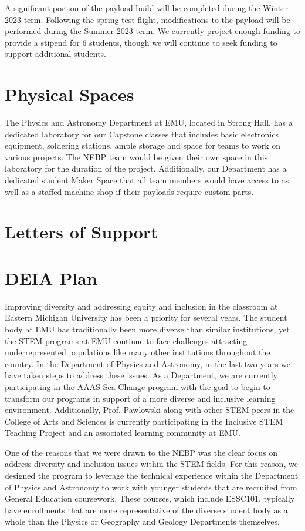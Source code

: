 \documentclass[12pt]{article}
\begin{document}
A significant portion of the payload build will be completed during the Winter 2023
term. Following the spring test flight, modifications to the payload will be 
performed during the Summer 2023 term. We currently project enough funding to 
provide a stipend for 6 students, though we will continue to seek funding to support 
additional students.




\section{Physical Spaces}
The Physics and Astronomy Department at EMU, located in Strong Hall, has a dedicated 
laboratory for our Capstone classes that includes basic electronics equipment, 
soldering stations, ample storage and space for teams to work on various projects.
 The NEBP team would be given their own space in this laboratory for the duration of 
 the project. Additionally, our Department has a dedicated student Maker Space that all
  team members would have access to as well as a staffed machine shop if their payloads 
  require custom parts.


\section{Letters of Support}


\section{DEIA Plan}

Improving diversity and addressing equity and inclusion in the classroom 
at Eastern Michigan University has been a priority for several years. The student 
body at EMU has traditionally been more diverse than similar institutions, yet the STEM 
programs at EMU  
continue to face challenges attracting underrepresented populations like many other 
institutions throughout the country. In the Department of Physics and Astronomy, in the last
two years we have taken steps to address these issues. As a Department, we are currently 
participating in the AAAS Sea Change program with the goal to begin to transform 
our programs in support of a more diverse and inclusive learning environment. Additionally,
Prof. Pawlowski along with other STEM peers in the College of Arts and Sciences is currently 
participating in the Inclusive STEM Teaching Project and an associated learning community 
at EMU.

One of the reasons that we were drawn to the NEBP was the clear focus on address 
diversity and inclusion issues within the STEM fields. For this reason, we designed 
the program to leverage the technical experience within the Department of Physics and 
Astronomy to work with younger students that are recruited from General Education coursework.
These courses, which include ESSC101, typically have enrollments that are more representative 
of the diverse student body as a whole than the Physics or Geography and Geology Departments
themselves. 
\end{document}
